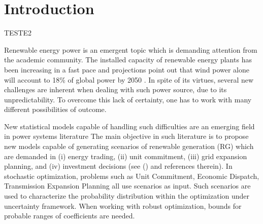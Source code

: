 \section{Introduction}


TESTE2

Renewable energy power is an emergent topic which is demanding attention from the academic community. %
The installed capacity of renewable energy plants has been increasing in a fast pace and projections point out that wind power alone will account to 18\% of global power by 2050  \cite{IntEnerAgency}.
In spite of its virtues, several new challenges are inherent when dealing with such power source, due to its unpredictability. To overcome this lack of certainty, one has to work with many different possibilities of outcome.

New statistical models capable of handling such difficulties are an emerging field in power systems literature \cite{zhang_review_2014, bessa2012time, gallego2016line,moller_time-adaptive_2008,nielsen2006,bremnes_probabilistic_2004,wan_direct_2017} 
The main objective in such literature is to propose new models capable of generating scenarios of renewable generation (RG) which are demanded in (i) energy trading, (ii) unit commitment, (iii) grid expansion planning, and (iv) investment decisions (see (\cite{moreiraStreet,jabr2013robust,zhaoguan,Aderson2017}) and references therein). 
In stochastic optimization, problems such as Unit Commitment, Economic Dispatch, Transmission Expansion Planning all use scenarios as input. 
Such scenarios are used to characterize the probability distribution within the optimization under uncertainty framework.
When working with robust optimization, bounds for probable ranges of coefficients are needed.

 
